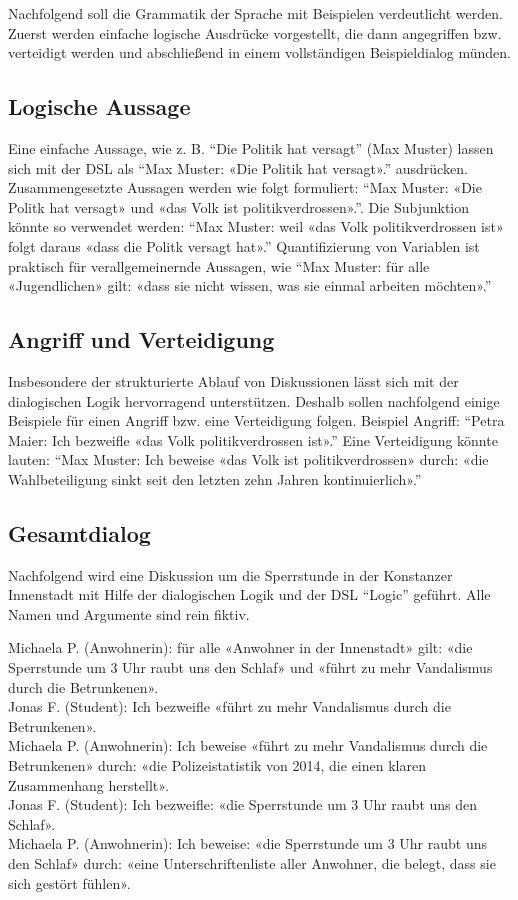 \documentclass[11pt,a4paper,bibtotocnumbered]{scrreprt}
\begin{document}
Nachfolgend soll die Grammatik der Sprache mit Beispielen verdeutlicht werden.
Zuerst werden einfache logische Ausdrücke vorgestellt, die dann angegriffen bzw. verteidigt werden und abschließend in einem vollständigen Beispieldialog münden.

\subsection{Logische Aussage}

Eine einfache Aussage, wie z. B. \enquote{Die Politik hat versagt} (Max Muster) lassen sich mit der DSL als \enquote{Max Muster: «Die Politik hat versagt».} ausdrücken.
Zusammengesetzte Aussagen werden wie folgt formuliert: \enquote{Max Muster: «Die Politk hat versagt» und «das Volk ist politikverdrossen».}.
Die Subjunktion könnte so verwendet werden: \enquote{Max Muster: weil «das Volk politikverdrossen ist» folgt daraus «dass die Politk versagt hat».}
Quantifizierung von Variablen ist praktisch für verallgemeinernde Aussagen, wie \enquote{Max Muster: für alle «Jugendlichen» gilt: «dass sie nicht wissen, was sie einmal arbeiten möchten».}

\subsection{Angriff und Verteidigung}

Insbesondere der strukturierte Ablauf von Diskussionen lässt sich mit der dialogischen Logik hervorragend unterstützen. Deshalb sollen nachfolgend einige Beispiele für einen Angriff bzw. eine Verteidigung folgen.
Beispiel Angriff: \enquote{Petra Maier: Ich bezweifle «das Volk politikverdrossen ist».}
Eine Verteidigung könnte lauten: \enquote{Max Muster: Ich beweise «das Volk ist politikverdrossen» durch: «die Wahlbeteiligung sinkt seit den letzten zehn Jahren kontinuierlich».}

\subsection{Gesamtdialog}

Nachfolgend wird eine Diskussion um die Sperrstunde in der Konstanzer Innenstadt mit Hilfe der dialogischen Logik und der DSL \enquote{Logic} geführt. 
Alle Namen und Argumente sind rein fiktiv.

Michaela P. (Anwohnerin): für alle «Anwohner in der Innenstadt» gilt: «die Sperrstunde um 3 Uhr raubt uns den Schlaf» und «führt zu mehr Vandalismus durch die Betrunkenen».\\
Jonas F. (Student): Ich bezweifle «führt zu mehr Vandalismus durch die Betrunkenen».\\
Michaela P. (Anwohnerin): Ich beweise «führt zu mehr Vandalismus durch die Betrunkenen» durch: «die Polizeistatistik von 2014, die einen klaren Zusammenhang herstellt». \\
Jonas F. (Student): Ich bezweifle: «die Sperrstunde um 3 Uhr raubt uns den Schlaf».\\
Michaela P. (Anwohnerin): Ich beweise: «die Sperrstunde um 3 Uhr raubt uns den Schlaf» durch: «eine Unterschriftenliste aller Anwohner, die belegt, dass sie sich gestört fühlen».
\end{document}
